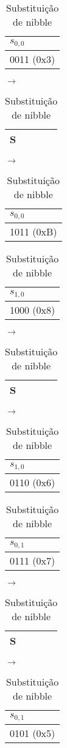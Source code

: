 \documentclass[
    article,            %
    11pt,               %
    oneside,            %
    a4paper,            %
    english,            %
    brazil,             %
    sumario=tradicional,
    ]{abntex2}
\begin{document}
\begin{table}[H]
\centering
\caption{Substituição de nibble}
\label{round1-nibbles-change}
\begin{tabular}{|l|}
\hline
$s_{0,0}$  \\ \hline
0011 (0x3)      \\ \hline
\end{tabular}
$\longrightarrow$
\begin{tabular}{|l|}
\hline
S  \\ \hline
\end{tabular}
$\longrightarrow$
\begin{tabular}{|l|}
\hline
$s_{0,0}$  \\ \hline
1011 (0xB)       \\ \hline
\end{tabular}

\vspace{0.5cm}

\begin{tabular}{|l|}
\hline
$s_{1,0}$  \\ \hline
1000 (0x8)      \\ \hline
\end{tabular}
$\longrightarrow$
\begin{tabular}{|l|}
\hline
S  \\ \hline
\end{tabular}
$\longrightarrow$
\begin{tabular}{|l|}
\hline
$s_{1,0}$  \\ \hline
0110 (0x6)       \\ \hline
\end{tabular}

\vspace{0.5cm}

\begin{tabular}{|l|}
\hline
$s_{0,1}$  \\ \hline
0111 (0x7)      \\ \hline
\end{tabular}
$\longrightarrow$
\begin{tabular}{|l|}
\hline
S  \\ \hline
\end{tabular}
$\longrightarrow$
\begin{tabular}{|l|}
\hline
$s_{0,1}$  \\ \hline
0101 (0x5)       \\ \hline
\end{tabular}

\vspace{0.5cm}


\end{table}
\end{document}
